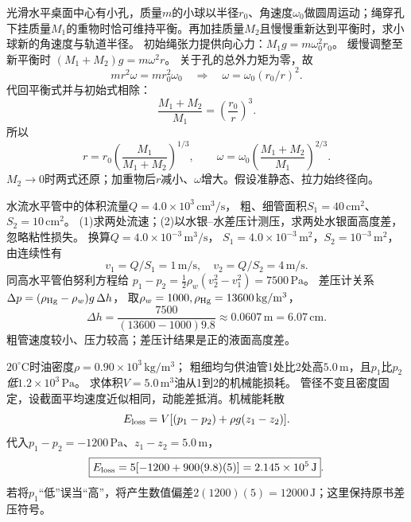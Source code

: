\problemtext 光滑水平桌面中心有小孔，质量$m$的小球以半径$r_0$、角速度$\omega_0$做圆周运动；绳穿孔下挂质量$M_1$的重物时恰可维持平衡。再加挂质量$M_2$且慢慢重新达到平衡时，求小球新的角速度与轨道半径。
\workings
初始绳张力提供向心力：$M_1g=m\omega_0^2 r_0$。
缓慢调整至新平衡时
$(M_1+M_2)g=m\omega^2r$。
关于孔的总外力矩为零，故
\[
mr^2\omega=mr_0^2\omega_0
\quad\Longrightarrow\quad
\omega=\omega_0(r_0/r)^2.
\]
代回平衡式并与初始式相除：
\[
\frac{M_1+M_2}{M_1}=\left(\frac{r_0}{r}\right)^3.
\]
所以
\[
\boxed{r=r_0\left(\frac{M_1}{M_1+M_2}\right)^{1/3}},\qquad
\boxed{\omega=\omega_0\left(\frac{M_1+M_2}{M_1}\right)^{2/3}}.
\]
\crosscheck $M_2\to0$时两式还原；加重物后$r$减小、$\omega$增大。假设准静态、拉力始终径向。

\problemtext 水流水平管中的体积流量$Q=4.0\times10^3\,\mathrm{cm^3/s}$，
粗、细管面积$S_1=40\,\mathrm{cm^2}$、$S_2=10\,\mathrm{cm^2}$。
(1)求两处流速；(2)以水银--水差压计测压，求两处水银面高度差，忽略粘性损失。
\workings
换算$Q=4.0\times10^{-3}\,\mathrm{m^3/s}$，
$S_1=4.0\times10^{-3}\,\mathrm{m^2}$，$S_2=10^{-3}\,\mathrm{m^2}$，由连续性有
\[
\boxed{v_1=Q/S_1=1\,\mathrm{m/s}},\quad
\boxed{v_2=Q/S_2=4\,\mathrm{m/s}}.
\]
同高水平管伯努利方程给
$p_1-p_2=\frac12\rho_w(v_2^2-v_1^2)=7500\,\mathrm{Pa}$。
差压计关系
$\Delta p=(\rho_{\rm Hg}-\rho_w)g\,\Delta h$，
取$\rho_w=1000,\rho_{\rm Hg}=13600\,\mathrm{kg/m^3}$，
\[
\boxed{\Delta h=\frac{7500}{(13600-1000)9.8}
\approx0.0607\,\mathrm m=6.07\,\mathrm{cm}}.
\]
\crosscheck 粗管速度较小、压力较高；差压计结果是正的液面高度差。

\problemtext $20^\circ\mathrm C$时油密度$\rho=0.90\times10^3\,\mathrm{kg/m^3}$；
粗细均匀供油管1处比2处高$5.0\,\mathrm m$，且$p_1$比$p_2$\emph{低}$1.2\times10^3\,\mathrm{Pa}$。
求体积$V=5.0\,\mathrm{m^3}$油从1到2的机械能损耗。
\workings
管径不变且密度固定，设截面平均速度近似相同，动能差抵消。机械能耗散
\[
E_{\rm loss}=V[(p_1-p_2)+\rho g(z_1-z_2)].
\]
代入$p_1-p_2=-1200\,\mathrm{Pa}$、$z_1-z_2=5.0\,\mathrm m$，
\[
\boxed{E_{\rm loss}=5[-1200+900(9.8)(5)]
=2.145\times10^5\,\mathrm J}.
\]
\crosscheck 若将$p_1$“低”误当“高”，将产生数值偏差$2(1200)(5)=12000\,\mathrm J$；这里保持原书差压符号。
